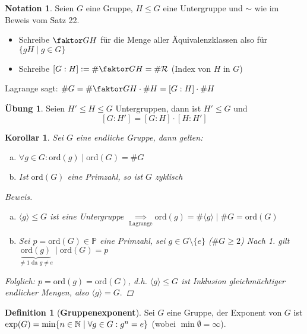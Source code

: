 \documentclass[a4paper]{report}
\theoremstyle{plain}
\newtheorem{kor}[thm]{Korollar}
\theoremstyle{definition}
\newtheorem{defi}[thm]{Definition}
\newtheorem*{nota*}{Notation}
\newtheorem{ubng}[thm]{Übung}
\begin{document}
\begin{nota*}
Seien $G$ eine Gruppe, $H \le G$ eine Untergruppe und $\sim$ wie im Beweis vom Satz 22.
\begin{itemize}
\item Schreibe $\faktor GH$ für die Menge aller Äquivalenzklassen also für $\{gH \mid g \in G\}$
\item Schreibe $[G : H]:= \#  \faktor GH = \# \mathcal R$ (Index von $H$ in $G$)
\end{itemize}
Lagrange sagt: $\#G = \# \faktor GH \cdot \#H = [G : H] \cdot \#H$
\end{nota*}

\begin{ubng}
Seien $H' \le H \le G$ Untergruppen, dann ist $H' \le G$ und
$$[G: H'] = [G:H]\cdot[H:H']$$
\end{ubng}

\begin{kor} %
  Sei $G$ eine endliche Gruppe, dann gelten:
  \begin{enumerate}[(a)]
    \item $\forall g \in G : \mathrm{ord}(g) \mid \mathrm{ord}(G) = \#G$
    \item Ist $\mathrm{ord}(G)$ eine Primzahl, so ist $G$ zyklisch
  \end{enumerate}
  \begin{proof}[Beweis] \item
    \begin{enumerate}[(a)]
\item $\langle g \rangle \le G$ ist eine Untergruppe $\underset{\text{Lagrange}}\implies \mathrm{ord}(g) = \#\langle g \rangle \mid \#G = \mathrm{ord}(G)$
\item Sei $p = \mathrm{ord}(G) \in \mathbb P$ eine Primzahl, sei $g \in G \setminus \{e\}$ ($\#G \ge 2$)
Nach 1. gilt $\underbrace{\mathrm{ord}(g)}_{\neq 1 \text{ da } g \neq e} \mid \mathrm{ord}(G) = p$
    \end{enumerate}
Folglich: $p = \mathrm{ord}(g) = \mathrm{ord}(G)$, d.h. $\langle g \rangle \le G$ ist Inklusion gleichmächtiger endlicher Mengen, also $\langle g \rangle = G.$
\end{proof}
\end{kor}

\begin{defi}[\textbf{Gruppenexponent}]
Sei $G$ eine Gruppe, der Exponent von $G$ ist $\exp(G) = \min \{n \in \Bbb N \mid \forall g \in G : g^{n} = e\}$ (wobei $\min \emptyset = \infty$).
\end{defi}
\end{document}
